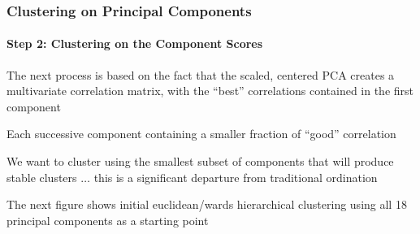 \documentclass[10pt]{beamer}
\begin{document}
\begin{frame}[fragile]
\frametitle{Clustering on Principal Components}
\framesubtitle{Step 2:  Clustering on the Component Scores}

\bi
\item The next process is based on the fact that the scaled, centered
  PCA creates a multivariate correlation matrix, with the ``best''
  correlations contained in the first component

\item Each successive component containing a smaller fraction of
  ``good'' correlation

\item We want to cluster using the smallest subset of components that
  will produce stable clusters $\ldots$ this is a significant
  departure from traditional ordination

\item The next figure shows initial euclidean/wards hierarchical clustering
  using all 18 principal components as a starting point
\ei
\end{frame}
\end{document}
